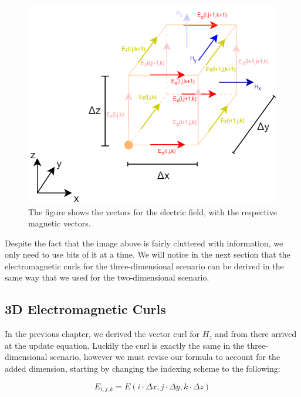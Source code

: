 \begin{figure}[h!]
	\centering
	\includegraphics[scale=0.6]{Figures/fdtd3dFull}
	\decoRule
	\caption[3D Electric Discretization]{The figure shows the vectors for the electric field, with the respective magnetic vectors.}
	\label{fig:fdtd3dFull}
\end{figure}

Despite the fact that the image above is fairly cluttered with information, we only need to use bits of it at a time. We will notice in the next section that the electromagnetic curls for the three-dimensional scenario can be derived in the same way that we used for the two-dimensional scenario.

\subsection{3D Electromagnetic Curls}

In the previous chapter, we derived the vector curl for $H_z$ and from there arrived at the update equation. Luckily the curl is exactly the same in the three-dimensional scenario, however we must revise our formula to account for the added dimension, starting by changing the indexing scheme to the following:

\begin{equation}
	\label{eqn:indexing3DElectric}
	E_{i,j,k} = E(i \cdot \Delta x , j \cdot \Delta y, k \cdot \Delta z)
\end{equation}


